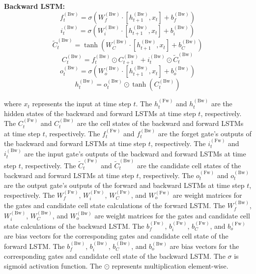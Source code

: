 \textbf{Backward LSTM:}
\begin{equation}
f_t^{(\text{Bw})} = \sigma(W_{f}^{(\text{Bw})} \cdot [h_{t+1}^{(\text{Bw})}, x_t] + b_{f}^{(\text{Bw})})
\end{equation}
\begin{equation}
i_t^{(\text{Bw})} = \sigma(W_{i}^{(\text{Bw})} \cdot [h_{t+1}^{(\text{Bw})}, x_t] + b_{i}^{(\text{Bw})})
\end{equation}
\begin{equation}
\tilde{C}_t^{(\text{Bw})} = \tanh(W_{C}^{(\text{Bw})} \cdot [h_{t+1}^{(\text{Bw})}, x_t] + b_{C}^{(\text{Bw})})
\end{equation}
\begin{equation}
C_t^{(\text{Bw})} = f_t^{(\text{Bw})} \odot C_{t+1}^{(\text{Bw})} + i_t^{(\text{Bw})} \odot \tilde{C}_t^{(\text{Bw})}
\end{equation}
\begin{equation}
o_t^{(\text{Bw})} = \sigma(W_{o}^{(\text{Bw})} \cdot [h_{t+1}^{(\text{Bw})}, x_t] + b_{o}^{(\text{Bw})})
\end{equation}
\begin{equation}
h_t^{(\text{Bw})} = o_t^{(\text{Bw})} \odot \tanh(C_t^{(\text{Bw})})
\end{equation}

where \(x_t\) represents the input at time step \(t\). The
\(h_t^{(\text{Fw})}\) and \(h_t^{(\text{Bw})}\) are the hidden states of the backward and forward LSTMs at time step \(t\), respectively. The
\(C_t^{(\text{Fw})}\) and \(C_t^{(\text{Bw})}\) are the cell states of the backward and forward LSTMs at time step \(t\), respectively. The
\(f_t^{(\text{Fw})}\) and \(f_t^{(\text{Bw})}\) are the forget gate's outputs of the backward and forward LSTMs at time step \(t\), respectively. The
\(i_t^{(\text{Fw})}\) and \(i_t^{(\text{Bw})}\) are the input gate's outputs of the backward and forward LSTMs at time step \(t\), respectively. The
\(\tilde{C}_t^{(\text{Fw})}\) and \(\tilde{C}_t^{(\text{Bw})}\) are the candidate cell states of the backward and forward LSTMs at time step \(t\), respectively. The
\(o_t^{(\text{Fw})}\) and \(o_t^{(\text{Bw})}\) are the output gate's outputs of the forward and backward LSTMs at time step \(t\), respectively. The
\(W_{f}^{(\text{Fw})}\), \(W_{i}^{(\text{Fw})}\), \(W_{C}^{(\text{Fw})}\), and \(W_{o}^{(\text{Fw})}\) are weight matrices for the gates and candidate cell state calculations of the forward LSTM. The
\(W_{f}^{(\text{Bw})}\), \(W_{i}^{(\text{Bw})}\), \(W_{C}^{(\text{Bw})}\), and \(W_{o}^{(\text{Bw})}\) are weight matrices for the gates and candidate cell state calculations of the backward LSTM. The
\(b_{f}^{(\text{Fw})}\), \(b_{i}^{(\text{Fw})}\), \(b_{C}^{(\text{Fw})}\), and \(b_{o}^{(\text{Fw})}\) are bias vectors for the corresponding gates and candidate cell state of the forward LSTM. The
\(b_{f}^{(\text{Bw})}\), \(b_{i}^{(\text{Bw})}\), \(b_{C}^{(\text{Bw})}\), and \(b_{o}^{(\text{Bw})}\) are bias vectors for the corresponding gates and candidate cell state of the backward LSTM. The
\(\sigma\) is sigmoid activation function. The
\(\odot\) represents multiplication element-wise.

